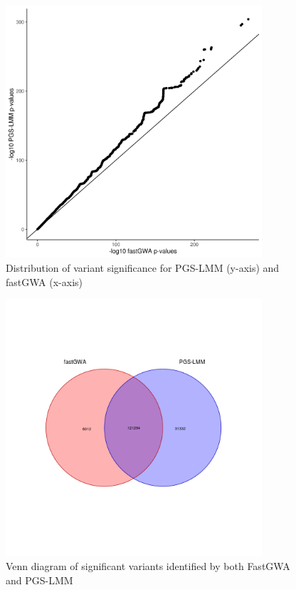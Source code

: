 \documentclass{article}
\begin{document}
\begin{figure}[h!]
  \includegraphics[width=0.85\textwidth]{images/SFig1.png}
  \caption{Distribution of variant significance for PGS-LMM (y-axis) and fastGWA (x-axis)}
\end{figure}

\begin{figure}[h!]
  \includegraphics[width=0.85\textwidth]{images/SFig2.png}
  \caption{Venn diagram of significant variants identified by both FastGWA and PGS-LMM }
\end{figure}
\end{document}
